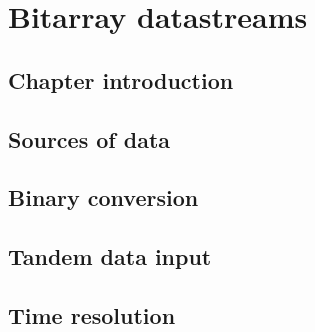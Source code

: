 \chapter{Bitarray datastreams}
\minitoc
\section{Chapter introduction}
\section{Sources of data}
\section{Binary conversion}
\section{Tandem data input}
\section{Time resolution}
